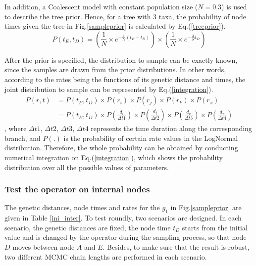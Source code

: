 \documentclass{bmcart}
\begin{document}
In addition, a Coalescent model with constant population size ($N=0.3$) is used to describe the tree prior. Hence, for a tree with 3 taxa, the probability of node times given the tree in Fig.\ref{sampleprior} is calculated by Eq.(\ref{treeprior}).
\begin{equation}\label{treeprior}
P({t_E},{t_D}) = (\frac{1}{N} \times {e^{ - \frac{1}{N}({t_E} - {t_D})}}) \times (\frac{1}{N} \times {e^{ - \frac{3}{N}{t_D}}})
\end{equation}

After the prior is specified, the distribution to sample can be exactly known, since the samples are drawn from the prior distributions. In other words, according to the rates being the functions of its genetic distance and times, the joint distribution to sample can be represented by Eq.(\ref{integration}).
\begin{equation}\label{integration}
\begin{aligned}
P(r,t) &= P({t_E},{t_D}) \times P({r_i}) \times P({r_j}) \times P({r_k}) \times P({r_x}) \\&= P({t_E},{t_D}) \times P(\frac{{{d_i}}}{{\Delta t1}}) \times P(\frac{{{d_j}}}{{\Delta t2}}) \times P(\frac{{{d_k}}}{{\Delta t3}}) \times P(\frac{{{d_x}}}{{\Delta t4}})
\end{aligned}
\end{equation}
, where ${\Delta t1}$, ${\Delta t2}$, ${\Delta t3}$, ${\Delta t4}$ represents the time duration along the corresponding branch, and $P({.})$ is the probability of certain rate values in the LogNormal distribution. Therefore, the whole probability can be obtained by conducting numerical integration on Eq.(\ref{integration}), which shows the probability distribution over all the possible values of parameters.
\subsubsection*{Test the operator on internal nodes}
The genetic distances, node times and rates for the $g_1$ in Fig.\ref{sampleprior} are given in Table \ref{ini_inter}. To test roundly, two scenarios are designed. In each scenario, the genetic distances are fixed, the node time $t_D$ starts from the initial value and is changed by the operator during the sampling process, so that node $D$ moves between node $A$ and $E$. Besides, to make sure that the result is robust, two different MCMC chain lengths are performed in each scenario.
\end{document}
